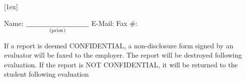 {\begin{fminipage}{\textwidth}[1ex]
			\bigbreak

			Name: $\underset{\text{(print)}}{\underline{\hspace{3.2cm}}}$
			\hspace{0.5ex}
			E-Mail: {\underline{\hspace{3cm}} \hspace{0.5ex}}
			Fax \#: {\underline{\hspace{2.1cm}}}

			\medbreak

			If a report is deemed CONFIDENTIAL, a non-disclosure form signed
			by an evaluator will be faxed to the employer. The report will be
			destroyed following evaluation. If the report is NOT CONFIDENTIAL,
			it will be returned to the student following evaluation

		\end{fminipage}}
\makeatother
